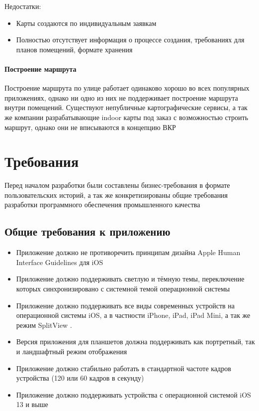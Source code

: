         \noindent Недостатки:
        \begin{itemize}
          \item Карты создаются по индивидуальным заявкам
          \item Полностью отсутствует информация о процессе создания, требованиях для планов помещений, формате хранения
        \end{itemize}

    \subsubsection{Построение маршрута}
      Построение маршрута по улице работает одинаково хорошо во всех популярных приложениях, однако ни одно из них не поддерживает построение маршрута внутри помещений. Существуют непубличные картографические сервисы, а так же компании разрабатывающие indoor карты под заказ с возможностью строить маршрут, однако они не вписываются в концепцию ВКР

\chapter{Требования}
  Перед началом разработки были составлены бизнес-требования в формате пользовательских историй, а так же конкретизированы общие требования разработки программного обеспечения промышленного качества

  \section{Общие требования к приложению}
    \begin{itemize}
      \item Приложение должно не противоречить принципам дизайна Apple Human Interface Guidelines для iOS \cite{HumanInterfaceGuidelines}
      \item Приложение должно поддерживать светлую и тёмную темы, переключение которых синхронизировано с системной темой операционной системы
      \item Приложение должно поддерживать все виды современных устройств на операционной системы iOS, а в частности iPhone, iPad, iPad Mini, а так же режим SplitView \cite{SplitView}.
      \item Версия приложения для планшетов должна поддерживать как портретный, так и ландшафтный режим отображения
      \item Приложение должно стабильно работать в стандартной частоте кадров устройства (120 или 60 кадров в секунду)
      \item Приложение должно поддерживать устройства с операционной системой iOS 13 и выше
    \end{itemize}


